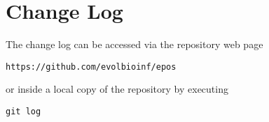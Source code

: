 \documentclass[a4paper, english]{article}
\begin{document}
\section{Change Log}
The change log can be accessed via the repository web page
\begin{verbatim}
https://github.com/evolbioinf/epos
\end{verbatim}
or inside a local copy of the repository by executing
\begin{verbatim}
git log
\end{verbatim}


\end{document}

